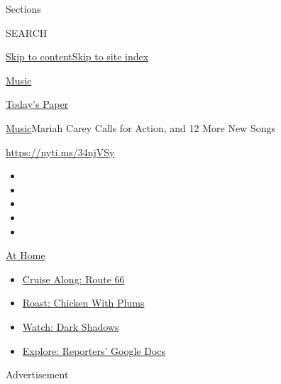 Sections

SEARCH

\protect\hyperlink{site-content}{Skip to
content}\protect\hyperlink{site-index}{Skip to site index}

\href{https://www.nytimes3xbfgragh.onion/section/arts/music}{Music}

\href{https://myaccount.nytimes3xbfgragh.onion/auth/login?response_type=cookie\&client_id=vi}{}

\href{https://www.nytimes3xbfgragh.onion/section/todayspaper}{Today's
Paper}

\href{/section/arts/music}{Music}\textbar{}Mariah Carey Calls for
Action, and 12 More New Songs

\url{https://nyti.ms/34njVSy}

\begin{itemize}
\item
\item
\item
\item
\item
\end{itemize}

\href{https://www.nytimes3xbfgragh.onion/spotlight/at-home?action=click\&pgtype=Article\&state=default\&region=TOP_BANNER\&context=at_home_menu}{At
Home}

\begin{itemize}
\tightlist
\item
  \href{https://www.nytimes3xbfgragh.onion/2020/09/07/travel/route-66.html?action=click\&pgtype=Article\&state=default\&region=TOP_BANNER\&context=at_home_menu}{Cruise
  Along: Route 66}
\item
  \href{https://www.nytimes3xbfgragh.onion/2020/09/04/dining/sheet-pan-chicken.html?action=click\&pgtype=Article\&state=default\&region=TOP_BANNER\&context=at_home_menu}{Roast:
  Chicken With Plums}
\item
  \href{https://www.nytimes3xbfgragh.onion/2020/09/04/arts/television/dark-shadows-stream.html?action=click\&pgtype=Article\&state=default\&region=TOP_BANNER\&context=at_home_menu}{Watch:
  Dark Shadows}
\item
  \href{https://www.nytimes3xbfgragh.onion/interactive/2020/at-home/even-more-reporters-editors-diaries-lists-recommendations.html?action=click\&pgtype=Article\&state=default\&region=TOP_BANNER\&context=at_home_menu}{Explore:
  Reporters' Google Docs}
\end{itemize}

Advertisement

